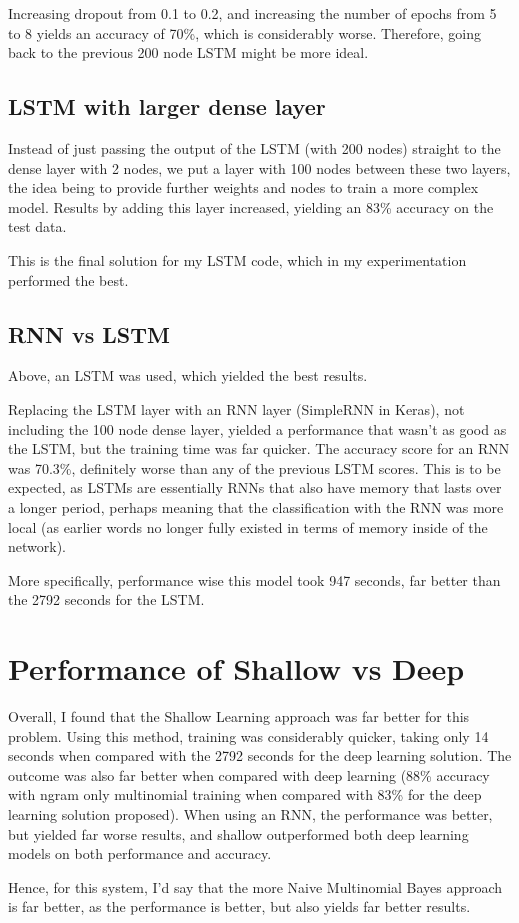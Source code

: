 \documentclass[12pt]{article}
\begin{document}
Increasing dropout from 0.1 to 0.2, and increasing the number of epochs from 5 to 8 yields an
accuracy of 70\%, which is considerably worse. Therefore, going back to the previous 200 node LSTM might be more ideal.

\subsection{LSTM with larger dense layer}
Instead of just passing the output of the LSTM (with 200 nodes) straight to the dense layer with 2 nodes, we put a layer with 100 nodes between these two layers,
the idea being to provide further weights and nodes to train a more complex model. Results by adding this layer increased, yielding an 83\% accuracy on the test data.

This is the final solution for my LSTM code, which in my experimentation performed the best.

\subsection{RNN vs LSTM}
Above, an LSTM was used, which yielded the best results.

Replacing the LSTM layer with an RNN layer (SimpleRNN in Keras), not including the 100 node dense layer,
yielded a performance that wasn't as good as the LSTM, but the training time was far quicker. The accuracy score for an RNN was
70.3\%, definitely worse than any of the previous LSTM scores. This is to be expected, as LSTMs are essentially RNNs that also have
memory that lasts over a longer period, perhaps meaning that the classification with the RNN was more local (as earlier words no longer fully 
existed in terms of memory inside of the network). 

More specifically, performance wise this model took 947 seconds, far better than the 2792 seconds for the LSTM.
\section{Performance of Shallow vs Deep}
Overall, I found that the Shallow Learning approach was far better for this problem. Using this method, training was considerably quicker, taking only 14 seconds when compared with the 2792 seconds for the deep learning solution.
The outcome was also far better when compared with deep learning (88\% accuracy with ngram only multinomial training when compared with 83\% for the deep learning solution proposed).
When using an RNN, the performance was better, but yielded far worse results, and shallow outperformed both deep learning models on both performance and accuracy.

Hence, for this system, I'd say that the more Naive Multinomial Bayes approach is far better, as the performance is better, but also yields far better results.
\end{document}
